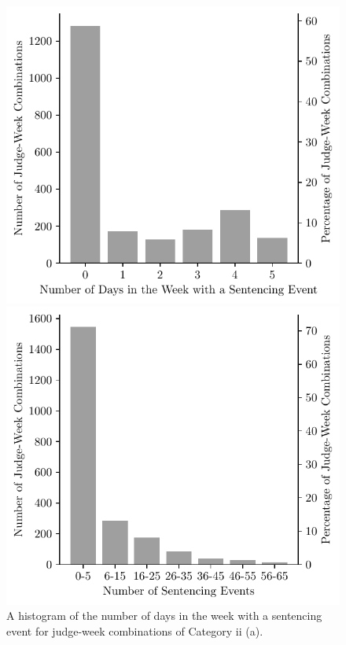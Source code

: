 \documentclass[11pt, oneside]{article}   	%
\theoremstyle{ModifiedStyle}
\begin{document}
			\begin{figure}[H]
				\centering
				\begin{minipage}{.45\textwidth}
					\centering
					\hspace*{-8mm}
					\includegraphics[scale=0.75]{Figures/Histogram_of_Number_of_Days_With_Sentences_Category_10}
					\hspace{4mm}
					\vspace{-6.0mm}
					\caption{A histogram of the number of days in the week with a sentencing event for judge-week combinations of Category ii (a).}
					\label{Figure_Histogram_of_Number_of_Days_With_Sentences_Category_10}
				\end{minipage}
				\hspace{5mm}
				\begin{minipage}{0.45\textwidth}
					\centering
					\hspace*{-3mm}
					\includegraphics[scale=0.75]{Figures/Histogram_of_Sentences_This_Week_Category_10}

\end{minipage}
\end{figure}
\end{document}
